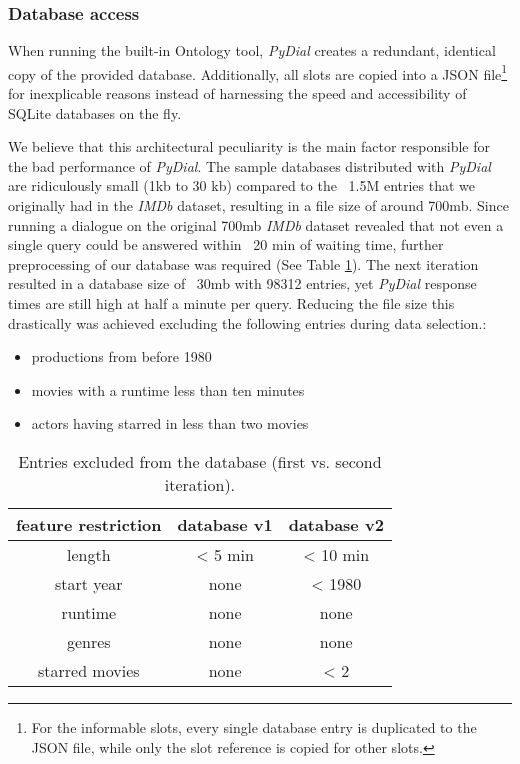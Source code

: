 \documentclass[11pt,a4paper]{article}
\begin{document}
	\subsubsection{Database access}
	\label{sec:pydialLimits-DB}
	When running the built-in Ontology tool, \textit{PyDial} creates a redundant, identical copy of the provided database. Additionally, all slots are copied into a JSON \cite{JSON} file\footnote{For the informable slots, every single database entry is duplicated to the JSON file, while only the slot reference is copied for other slots.} for inexplicable reasons instead of harnessing the speed and accessibility of SQLite databases on the fly.
	
	We believe that this architectural peculiarity is the main factor responsible for the bad performance of \textit{PyDial}. The sample databases distributed with \textit{PyDial} are ridiculously small (1kb to 30 kb) compared to the ~1.5M entries that we originally had in the \textit{IMDb} dataset, resulting in a file size of around 700mb. Since running a dialogue on the original 700mb \textit{IMDb} dataset revealed that not even a single query could be answered within ~20 min of waiting time, further preprocessing of our database was required (See Table \ref{tab:db-versions}).	
The next iteration resulted in a database size of ~30mb with 98312 entries, yet \textit{PyDial} response times are still high at half a minute per query. Reducing the file size this drastically was achieved excluding the following entries during data selection.:
	\begin{itemize}
	\item productions from before 1980
	\item movies with a runtime less than ten minutes
	\item actors having starred in less than two movies
	\end{itemize}
	
\begin{table}[H]
\centering
		\small
		\begin{tabular}{ccc}			
			\toprule[0.5mm]
			feature restriction & database v1 & database v2 \\[0.5mm]
			\midrule
			length & < 5 min & < 10 min\\[0.5mm]
			start year & none & < 1980\\[0.5mm]
			runtime & none & none\\[0.5mm]
			genres & none & none\\[0.5mm]
			\midrule
			starred movies & none & < 2\\[0.5mm]

			\bottomrule[0.5mm]
		\end{tabular}
		\caption{Entries excluded from the database (first vs. second iteration).}
		\label{tab:db-versions}
	\end{table}		
	
\end{document}
